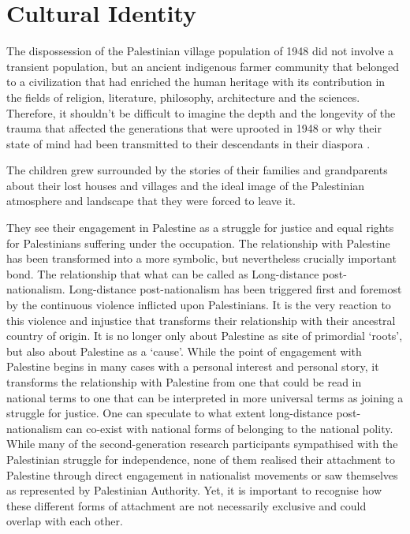 \section{Cultural Identity}
 
 The dispossession of the Palestinian village population of 1948 did not involve a transient population, but an ancient indigenous farmer community that belonged to a civilization that had enriched the human heritage with its contribution in the fields of religion, literature, philosophy, architecture and the sciences. Therefore, it shouldn't be difficult to imagine the depth and the longevity of the trauma that affected the generations that were uprooted in 1948 or why their state of mind had been transmitted to their descendants in their diaspora \citep{Khalidi2015}.
 
 The children grew surrounded by the stories of their families and grandparents about their lost houses and villages and the ideal image of the Palestinian atmosphere and landscape that they were forced to leave it.  


They see their engagement in Palestine as a struggle for justice and equal 
rights for Palestinians suffering under the occupation. The relationship with Palestine has been transformed into a more 
symbolic, but nevertheless crucially important bond. The relationship that what can be called as Long-distance post-nationalism. Long-distance post-nationalism  has been triggered 
first and foremost by the continuous violence inflicted upon Palestinians. It is the very 
reaction to this violence and injustice that transforms their relationship with their 
ancestral country of origin. It is no longer only about Palestine as site of primordial 
‘roots’, but also about Palestine as a ‘cause’. While the point of engagement with Palestine begins in many cases with a personal interest and personal story,  it transforms 
the relationship with Palestine from one that could be read in national 
terms to one that can be interpreted in more universal terms as joining a struggle 
for justice.
One can speculate to what extent 
long-distance post-nationalism can co-exist with national forms of belonging to the 
national polity. While many of the second-generation research participants sympathised 
with the Palestinian struggle for independence, none of them realised their attachment 
to Palestine through direct engagement in nationalist movements or saw themselves as 
represented by Palestinian Authority. Yet, it is important to recognise how these different forms of attachment are not necessarily exclusive and could overlap with each 
other\citep{Blachnicka-Ciacek2018}.

